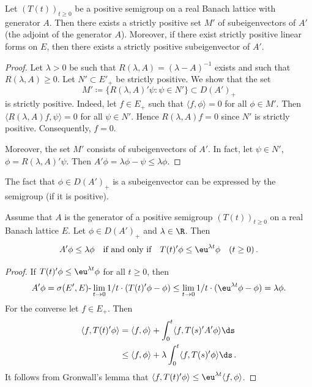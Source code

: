 \begin{proposition}\label{prop:c2-3.5}
%
Let $(T(t))_{t \geq 0}$ be a positive semigroup on a real Banach lattice with generator $A$.
Then there exists a strictly positive set $M'$ of subeigenvectors of\/ $A'$ (the adjoint of the generator $A$).
Moreover, if there exist strictly positive linear forms on $E$, then there exists a strictly positive subeigenvector of\/ $A'$.
\end{proposition}
\begin{proof}
Let $\lambda > 0$ be such that $R(\lambda,A) = (\lambda - A)^{-1}$ exists and such that $R(\lambda,A) \geq 0$.
Let $N' \subset E'_{+}$ be strictly positive.
We show that the set 
\[
M' \coloneq \{R(\lambda,A)'\psi \colon \psi \in N'\} \subset D(A')_{+}
\]
is strictly positive.
Indeed, let $f \in E_{+}$ such that $\langle f,\phi \rangle = 0$ for all $\phi \in M'$.
Then $\langle R(\lambda,A)f,\psi \rangle = 0$ for all $\psi \in N'$.
Hence $R(\lambda,A)f = 0$ since $N'$ is strictly positive.
Consequently, $f = 0$.

Moreover, the set $M'$ consists of
subeigenvectors of\/ $A'$. In fact, let $\psi \in N'$, $\phi = R(\lambda,A)'\psi$. Then
$A'\phi = \lambda\phi - \psi \leq \lambda\phi$.
\end{proof}
The fact that $\phi \in D(A')_{+}$ is a subeigenvector can be expressed by the
semigroup (if it is positive).
\begin{proposition}\label{prop:c2-3.6}
Assume that $A$ is the generator of a positive semigroup $(T(t))_{t \geq 0}$ on a real Banach lattice $E$. 
Let $\phi \in D(A')_{+}$ and $\lambda \in \R$. 
Then
\[
A'\phi \leq \lambda \phi \quad\text{if and only if}\quad T(t)'\phi \leq \eu^{\lambda t}\phi \quad (t \geq 0)\,.
\]
\end{proposition}
\begin{proof}
If\/ $T(t)'\phi \leq \eu^{\lambda t} \phi$ for all $t \geq 0$, then
\begin{align*}
A'\phi = \sigma(E',E)\text{-}\lim_{t \to 0} 1/t \cdot (T(t)'\phi - \phi) \leq \lim_{t \to 0} 1/t \cdot (\eu^{\lambda t}\phi - \phi) = \lambda\phi.
\end{align*}
For the converse let $f \in E_{+}$. Then
\begin{align*}
\langle f,T(t)'\phi \rangle &= \langle f,\phi \rangle + \int_{0}^{t} \langle f,T(s)'A'\phi \rangle \ds\\
&\leq \langle f,\phi \rangle + \lambda \int_{0}^{t} \langle f,T(s)'\phi \rangle \ds\,.
\end{align*}
It follows from Gronwall's lemma that $\langle f,T(t)'\phi \rangle \leq \eu^{\lambda t} \langle f,\phi \rangle$.
\end{proof}
